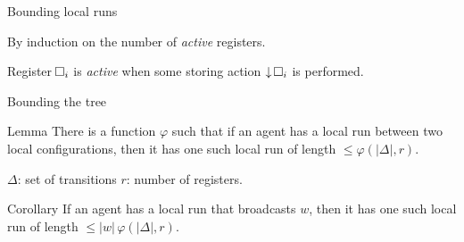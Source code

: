 \documentclass{beamer}
\newcommand{\reg}{\hspace{-0.5mm}\square}
\begin{document}




\begin{frame}{Bounding local runs}
	
	
	By induction on the number of \color{blue}\emph{active }\color{black} registers.
	
	Register $\reg_i$ is \emph{active} when some storing action $\downarrow \reg_i$ is performed. 
	\vspace{0.5cm}
	
	
	
\end{frame}

\begin{frame}{Bounding the tree}
	
	\begin{block}{Lemma}
		There is a function $\varphi$ such that if an agent has a local run between two local configurations, then it has one such local run of length $\leq \varphi(|\Delta|,r)$. 
	\end{block}
	
	$\Delta$: set of transitions \hspace{1cm} $r$: number of registers.
	
	\begin{block}{Corollary}
		If an agent has a local run that broadcasts $w$, then it has one such local run of length $\leq |w| \, \varphi(|\Delta|,r)$. 
	\end{block}
\end{frame}
\end{document}
